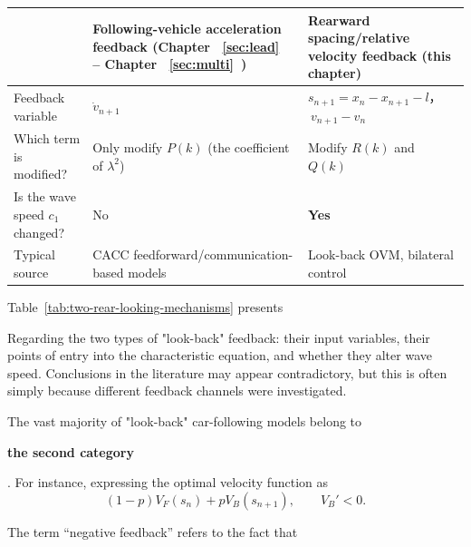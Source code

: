 \documentclass[11pt,a4paper,openany]{book}
\numberwithin{equation}{chapter}
\numberwithin{figure}{chapter}
\numberwithin{table}{chapter}
\newcommand{\tabletext}[2]{%
  \par\smallskip\noindent
  Table~\ref{#1} presents #2
\par\smallskip
}
\begin{document}
\begin{center}
\label{tab:two-rear-looking-mechanisms}
\begin{tabular}{p{3.2cm}p{5.4cm}p{5.4cm}}
\toprule
& \textbf{Following-vehicle acceleration feedback (Chapter ~\ref{sec:lead}~ – Chapter ~\ref{sec:multi}~)
} & \textbf{Rearward spacing/relative velocity feedback (this chapter)} \\
\midrule


Feedback variable

& $\dot v_{n+1}$ & $s_{n+1}=x_n-x_{n+1}-l$，$\ v_{n+1}-v_n$ \\[4pt]
Which term is modified?

&

Only modify $P(k)$ (the coefficient of $\lambda^2$)

&

Modify $R(k)$ and $Q(k)$
\\[4pt]
Is the wave speed $c_1$ changed?

&

No

& \textbf{Yes} \\[4pt]
Typical source&CACC feedforward/communication-based models

&

Look-back OVM, bilateral control
\\
\bottomrule
\end{tabular}
\end{center}
\tabletext{tab:two-rear-looking-mechanisms}{

Regarding the two types of "look-back" feedback: their input variables, their points of entry into the characteristic equation, and whether they alter wave speed. Conclusions in the literature may appear contradictory, but this is often simply because different feedback channels were investigated.
}

The vast majority of "look-back" car-following models belong to

\textbf{the second category}

. For instance, expressing the optimal velocity function as
\[
(1-p)V_F(s_n)+pV_B(s_{n+1}),\qquad V_B'<0.
\]





The term “negative feedback” refers to the fact that
\end{document}
